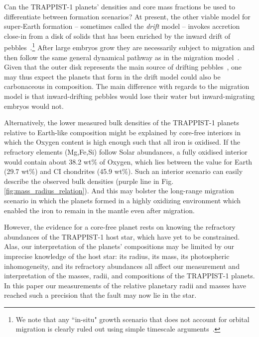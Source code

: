 \documentclass[twocolumn]{aastex63}
\begin{document}
Can the TRAPPIST-1 planets' densities and core mass fractions be used to differentiate between formation scenarios? At present, the other viable model for super-Earth formation -- sometimes called the {\em drift} model -- invokes accretion close-in from a disk of solids that has been enriched by the inward drift of pebbles~\citep{chatterjee14,chatterjee15,dawson15}.\footnote{We note that any ``in-situ" growth scenario that does not account for orbital migration is clearly ruled out using simple timescale arguments~\citep[i.e., because migration -- and even aerodynamic drift -- is far too fast to ignore; see][]{ogihara15,inamdar15,izidoro2018}.} After large embryos grow they are necessarily subject to migration and then follow the same general dynamical pathway as in the migration model~\citep[involving resonant capture and later breaking of resonant chains; see discussion in][]{raymond18d}. Given that the outer disk represents the main source of drifting pebbles~\citep{lambrechts14,ida16}, one may thus expect the planets that form in the drift model could also be carbonaceous in composition. The main difference with regards to the migration model is that inward-drifting pebbles would lose their water but inward-migrating embryos would not. %

Alternatively, the lower measured bulk densities of the TRAPPIST-1 planets relative to Earth-like composition might be explained by core-free interiors \citep{ElkinsTanton2008} in which the Oxygen content is high enough such that all iron is oxidised. If the refractory elements (Mg,Fe,Si) follow Solar abundances, a fully oxidised interior would contain about 38.2 wt\% of Oxygen, which lies between the value for Earth (29.7 wt\%) and CI chondrites (45.9 wt\%). Such an interior scenario can easily describe the observed bulk densities (purple line in Fig. \ref{fig:mass_radius_relation}).  And this may bolster the long-range migration scenario in which the planets formed in a highly oxidizing environment which enabled the iron to remain in the mantle even after migration.  

However, the evidence for a core-free planet rests on knowing the refractory abundances of the TRAPPIST-1 host star, which have yet to be constrained.  Alas, our interpretation of the planets' compositions may be limited by our imprecise knowledge of the host star:  its radius, its mass, its photospheric inhomogeneity, and its refractory abundances all affect our measurement and interpretation of the masses, radii, and compositions of the TRAPPIST-1 planets.  In this paper our measurements of the relative planetary radii and masses have reached such a precision that the fault may now lie in the star.
\end{document}
